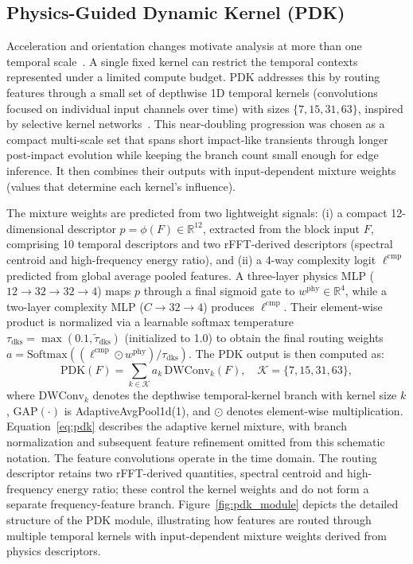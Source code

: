 \documentclass[jec]{acnsart}
\begin{document}
\FloatBarrier

\subsection{Physics-Guided Dynamic Kernel (PDK)}
Acceleration and orientation changes motivate analysis at more than one temporal scale~\cite{Wu2015Wearable}. A single fixed kernel can restrict the temporal contexts represented under a limited compute budget. PDK addresses this by routing features through a small set of depthwise 1D temporal kernels (convolutions focused on individual input channels over time) with sizes $\{7, 15, 31, 63\}$, inspired by selective kernel networks~\cite{li2019sknet}. This near-doubling progression was chosen as a compact multi-scale set that spans short impact-like transients through longer post-impact evolution while keeping the branch count small enough for edge inference. It then combines their outputs with input-dependent mixture weights (values that determine each kernel's influence).

The mixture weights are predicted from two lightweight signals: (i) a compact 12-dimensional descriptor $p=\phi(F)\in\mathbb{R}^{12}$, extracted from the block input $F$, comprising 10 temporal descriptors and two rFFT-derived descriptors (spectral centroid and high-frequency energy ratio), and (ii) a 4-way complexity logit $\ell^{\mathrm{cmp}}$ predicted from global average pooled features. A three-layer physics MLP ($12{\rightarrow}32{\rightarrow}32{\rightarrow}4$) maps $p$ through a final sigmoid gate to $w^{\mathrm{phy}}\in\mathbb{R}^{4}$, while a two-layer complexity MLP ($C{\rightarrow}32{\rightarrow}4$) produces $\ell^{\mathrm{cmp}}$. Their element-wise product is normalized via a learnable softmax temperature $\tau_{\mathrm{dks}}=\max(0.1,\tilde{\tau}_{\mathrm{dks}})$ (initialized to 1.0) to obtain the final routing weights $a=\mathrm{Softmax}((\ell^{\mathrm{cmp}}\odot w^{\mathrm{phy}})/\tau_{\mathrm{dks}})$. The PDK output is then computed as:
\begin{equation}
\label{eq:pdk}
\mathrm{PDK}(F) = \sum_{k\in\mathcal{K}} a_k\, \mathrm{DWConv}_{k}(F), \quad \mathcal{K}=\{7,15,31,63\},
\end{equation}
where $\mathrm{DWConv}_{k}$ denotes the depthwise temporal-kernel branch with kernel size $k$, $\mathrm{GAP}(\cdot)$ is AdaptiveAvgPool1d(1), and $\odot$ denotes element-wise multiplication. Equation~\ref{eq:pdk} describes the adaptive kernel mixture, with branch normalization and subsequent feature refinement omitted from this schematic notation. The feature convolutions operate in the time domain. The routing descriptor retains two rFFT-derived quantities, spectral centroid and high-frequency energy ratio; these control the kernel weights and do not form a separate frequency-feature branch. Figure~\ref{fig:pdk_module} depicts the detailed structure of the PDK module, illustrating how features are routed through multiple temporal kernels with input-dependent mixture weights derived from physics descriptors.
\end{document}

